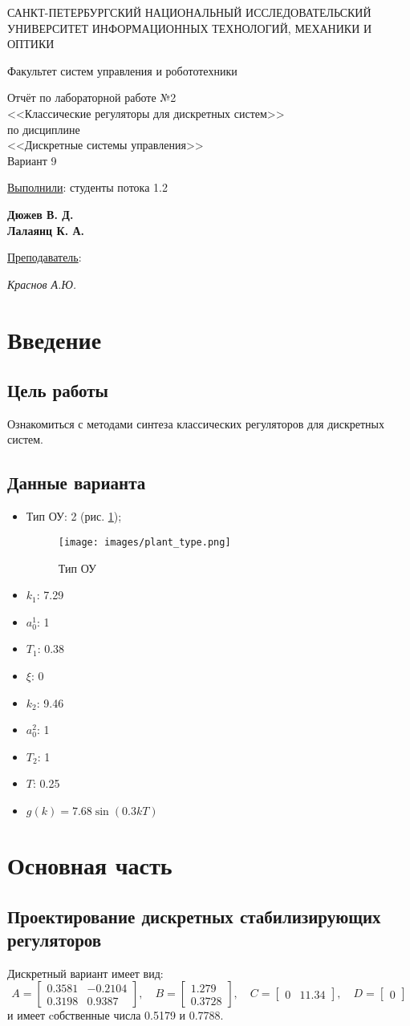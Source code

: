 \documentclass[a4paper, 14pt]{extarticle}
\theoremstyle{definition}
\theoremstyle{plain}
\theoremstyle{remark}
\newcommand*{\titlePage}{
	\thispagestyle{title}
	\begingroup
	\begin{center}
		\vspace*{3ex}
		{\small
			САНКТ-ПЕТЕРБУРГСКИЙ НАЦИОНАЛЬНЫЙ ИССЛЕДОВАТЕЛЬСКИЙ УНИВЕРСИТЕТ ИНФОРМАЦИОННЫХ ТЕХНОЛОГИЙ, МЕХАНИКИ И ОПТИКИ	
		}
		
		\vspace*{2ex}
		
		{\normalsize
			Факультет систем управления и робототехники
		}
		
		\vspace*{15ex}
		
		{
			Отчёт по лабораторной работе №2\\
			<<Классические регуляторы для дискретных систем>>\\
			по дисциплине\\
			<<Дискретные системы управления>>\\
				Вариант 9
			
		}
		
	\end{center}
	\vspace*{10ex}
	\begin{flushright}
		{\large 
			\underline{Выполнили}: студенты потока 1.2 \\
			\begin{flushright}
				\textbf{Дюжев В. Д.}\\
				\textbf{Лалаянц К. А.}\\
			\end{flushright}
		}
		\vspace*{5ex}
		{\large 
			\underline{Преподаватель}:\\ 
			\begin{flushright}
            \textit{Краснов А.Ю.}
			\end{flushright}
		}
	\end{flushright}	
	\newpage
	\setcounter{page}{1}
	\endgroup}
\begin{document}
\renewcommand{\contentsname}{\hfillОГЛАВЛЕНИЕ\hfill} 
\titlePage
\thispagestyle{plain}
\tableofcontents
\pagestyle{style}

\newpage
\setcounter{page}{1}

% 

\section{Введение}
\subsection{Цель работы}
Ознакомиться с методами синтеза классических регуляторов для дискретных систем.

\subsection{Данные варианта}
\begin{itemize}
	\item Тип ОУ: 2 (рис. \ref{fig:plant_type});
	\begin{figure}
	    [H]
	    \centering
	    \texttt{[image: images/plant\_type.png]}
	    \caption{Тип ОУ}
		\label{fig:plant_type}
	\end{figure}
	\item $k_1$: 7.29
    \item $a^1_0$: 1
    \item $T_1$: 0.38
    \item $\xi$: 0
    \item $k_2$: 9.46
    \item $a_0^2$: 1
    \item $T_2$: 1
    \item $T$: 0.25
    \item $g(k) = 7.68 \sin{(0.3kT)}$
\end{itemize}
\newpage

\section{Основная часть}
\subsection{Проектирование дискретных стабилизирующих регуляторов}
Дискретный вариант имеет вид:
\[
	A = \begin{bmatrix} 0.3581 & -0.2104 \\ 0.3198 & 0.9387 \end{bmatrix}, \quad
	B = \begin{bmatrix} 1.279 \\ 0.3728 \end{bmatrix}, \quad
	C = \begin{bmatrix} 0 & 11.34 \end{bmatrix}, \quad
	D = \begin{bmatrix} 0 \end{bmatrix}
\]
и имеет cобственные числа 0.5179 и 0.7788.
\end{document}

